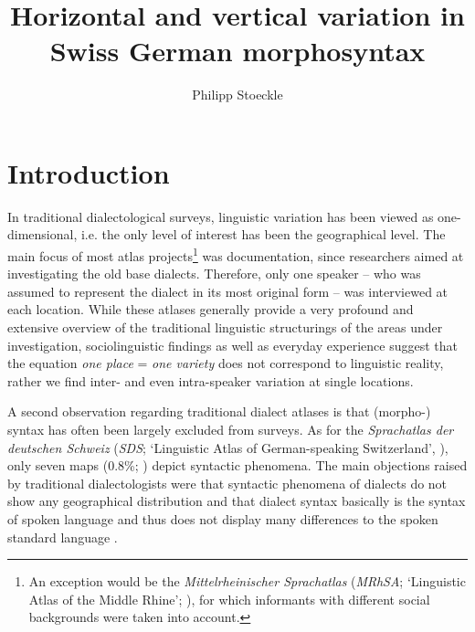 \documentclass[output=paper]{LSP/langsci}
\author{Philipp Stoeckle\affiliation{University of Zürich}}
\title{Horizontal and vertical variation in {Swiss German} morphosyntax}
\begin{document}
 

\section{Introduction}
In traditional dialectological surveys, linguistic variation has been viewed as one-dimensional, i.e. the only level of interest has been the geographical level. The main focus of most atlas projects\footnote{ An exception would be the \emph{Mittelrheinischer Sprachatlas} (\emph{MRhSA}; ‘Linguistic Atlas of the Middle Rhine’; \citealt{bellmann_mittelrheinischer_1994}), for which informants with different social backgrounds were taken into account.} was documentation, since researchers aimed at investigating the old base dialects. Therefore, only one speaker – who was assumed to represent the dialect in its most original form – was interviewed at each location. While these atlases generally provide a very profound and extensive overview of the traditional linguistic structurings of the areas under investigation, sociolinguistic findings as well as everyday experience suggest that the equation \emph{one place} = \emph{one variety} does not correspond to linguistic reality, rather we find inter- and even intra-speaker variation at single locations.

A second observation regarding traditional dialect atlases is that (morpho-) syntax has often been largely excluded from surveys. As for the \emph{Sprachatlas der deutschen Schweiz} (\emph{SDS}; ‘Linguistic Atlas of German-speaking Switzerland’, \citealt{hotzenkocherle_sprachatlas_1962}), only seven maps (0.8\%; \citealt[42]{bucheli_syntactic_2002}) depict syntactic phenomena. The main objections raised by traditional dialectologists were that syntactic phenomena of dialects do not show any geographical distribution and that dialect syntax basically is the syntax of spoken language and thus does not display many differences to the spoken standard language \citep[109]{loffler_dialektologie._2003}.
\end{document}
